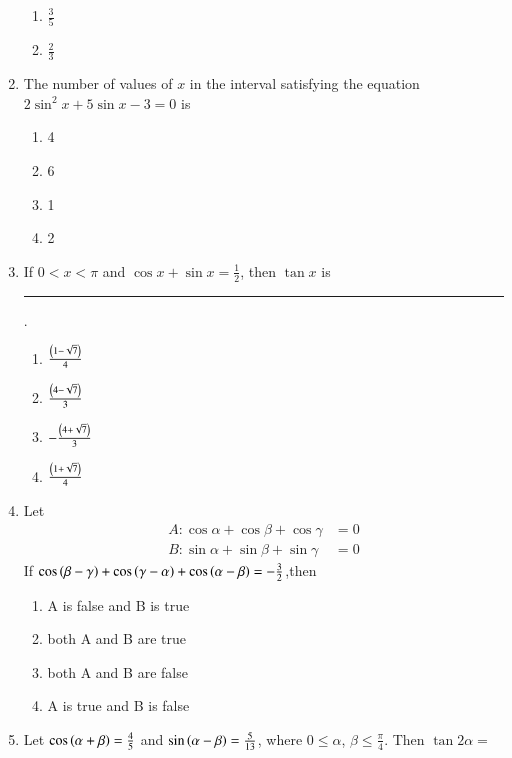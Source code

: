 \begin{enumerate}[label=\thesubsection.\arabic*,ref=\thesubsection.\theenumi]
\begin{multicols}{4}
\begin{enumerate}
\item $\frac{3}{5}$
\item $\frac{2}{3}$
\end{enumerate} 
\end{multicols}
\item The number of values of $x$ in the interval  satisfying the equation 
%
$2\sin^2 x+5\sin x-3=0$  is  \hfill{}
\begin{multicols}{4}
\begin{enumerate}
\item 4
\columnbreak
\item 6
\columnbreak
\item 1
\columnbreak
\item 2
\end{enumerate} 
\end{multicols}
\item If $0<x<\pi$ and $\cos x+\sin x=\frac{1}{2}$, then $\tan x$  is \rule{1cm}{0.1pt}. 
\hfill{}
\begin{multicols}{4} 
\begin{enumerate}
\item $\frac{\left(1-\sqrt{7}\right)}{4}$
\item $\frac{\left(4-\sqrt{7}\right)}{3}$
\columnbreak
\item $-\frac{\left(4+\sqrt{7}\right)}{3}$
\item $\frac{\left(1+\sqrt{7}\right)}{4}$
\end{enumerate} 
\end{multicols}
\item Let 
	\begin{align*}
		{A}:\cos\alpha+\cos\beta+\cos\gamma&=0
\\
		{B}:\sin\alpha+\sin\beta+\sin\gamma&=0
\end{align*}
If $\cos\left(\beta-\gamma\right)+\cos\left(\gamma-\alpha\right)+\cos\left(\alpha-\beta\right)=-\frac{3}{2}$,then
\hfill{}
\begin{multicols}{2} 
\begin{enumerate}
\item {A} is false and {B} is true 
\item both {A} and {B} are true
\item both {A} and {B} are false 
\item {A} is true and {B} is false
\end{enumerate}
\end{multicols}
\item Let $\cos\left(\alpha+\beta\right)=\frac{4}{5}$  and $\sin\left(\alpha-\beta\right)=\frac{5}{13}$, where $0\le\alpha$, $\beta\le\frac{\pi}{4}$. Then $\tan2\alpha=$ \hfill{}

\end{enumerate}
